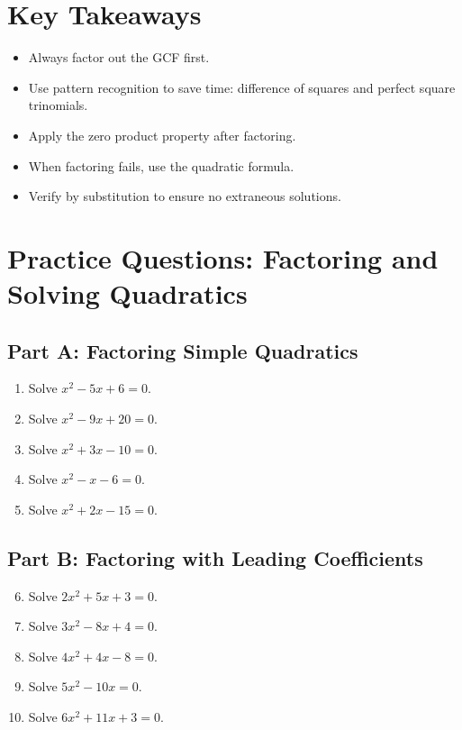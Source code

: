 \documentclass[12pt]{article}
\begin{document}
\section*{Key Takeaways}
\begin{itemize}
  \item Always factor out the GCF first.
  \item Use pattern recognition to save time: difference of squares and perfect square trinomials.
  \item Apply the zero product property after factoring.
  \item When factoring fails, use the quadratic formula.
  \item Verify by substitution to ensure no extraneous solutions.
\end{itemize}

\newpage


\section*{Practice Questions: Factoring and Solving Quadratics}

\subsection*{Part A: Factoring Simple Quadratics}
\begin{enumerate}
  \item Solve \(x^2 - 5x + 6 = 0.\)
  \item Solve \(x^2 - 9x + 20 = 0.\)
  \item Solve \(x^2 + 3x - 10 = 0.\)
  \item Solve \(x^2 - x - 6 = 0.\)
  \item Solve \(x^2 + 2x - 15 = 0.\)
\end{enumerate}

\subsection*{Part B: Factoring with Leading Coefficients}
\begin{enumerate}
  \setcounter{enumi}{5}
  \item Solve \(2x^2 + 5x + 3 = 0.\)
  \item Solve \(3x^2 - 8x + 4 = 0.\)
  \item Solve \(4x^2 + 4x - 8 = 0.\)
  \item Solve \(5x^2 - 10x = 0.\)
  \item Solve \(6x^2 + 11x + 3 = 0.\)
\end{enumerate}
\end{document}
